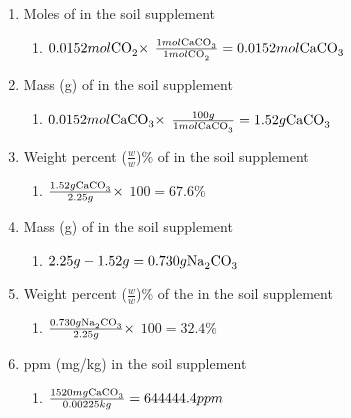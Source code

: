 \documentclass[10pt]{article}
\begin{document}
\begin{enumerate}
\begin{enumerate}
        \item Moles of  in the soil supplement
        \begin{enumerate}
            \item $0.0152 mol \ce{CO_2} \times$ $ \frac{1 mol \ce{CaCO_3}}{1 mol \ce{CO_2}} = 0.0152 mol \ce{CaCO_3}$
        \end{enumerate}
        \item Mass (g) of  in the soil supplement
        \begin{enumerate}
            \item $0.0152 mol \ce{CaCO_3} \times$ $ \frac{100g}{1 mol \ce{CaCO_3}} = 1.52g \ce{CaCO_3}$
        \end{enumerate}
        \item Weight percent ($\frac{w}{w}$)$\%$ of  in the soil supplement
        \begin{enumerate}
            \item $\frac{1.52g \ce{CaCO_3}}{2.25g} \times$ $ 100 = 67.6\%$
        \end{enumerate}
        \item Mass (g) of  in the soil supplement
         \begin{enumerate}
            \item $2.25g - 1.52g = 0.730g \ce{Na_2CO_3}$
        \end{enumerate}
        \item Weight percent ($\frac{w}{w}$)$\%$ of the  in the soil supplement
        \begin{enumerate}
            \item $\frac{0.730g \ce{Na_2CO_3}}{2.25g} \times$ $ 100 = 32.4\%$
        \end{enumerate}
        \item {} ppm (mg/kg) in the soil supplement
        \begin{enumerate}
            \item  $\frac{1520mg \ce{CaCO_3}}{0.00225kg} = 644444.4 ppm$
        \end{enumerate}
    \end{enumerate}
\end{enumerate}
\end{document}
